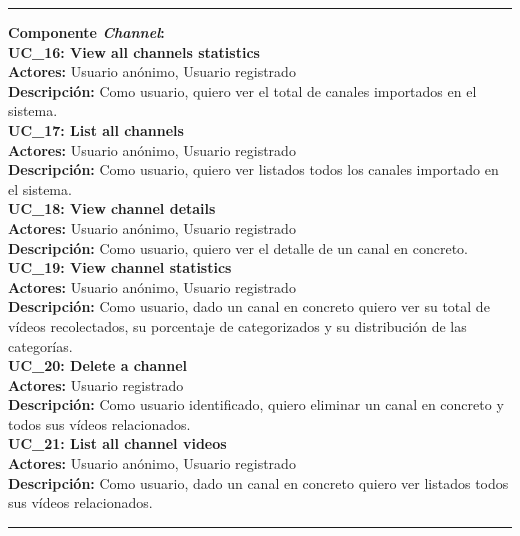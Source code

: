 \documentclass[11pt,a4paper]{article}
\begin{document}
\begin{center}\rule{10cm}{0.4pt}\end{center}

\noindent\textbf{Componente \textit{Channel}:}
\\

\noindent\textbf{UC\_16: View all channels statistics}\\
\textbf{Actores:} Usuario anónimo, Usuario registrado\\
\textbf{Descripción:} Como usuario, quiero ver el total de canales importados en el sistema.
\\

\noindent\textbf{UC\_17: List all channels}\\
\textbf{Actores:} Usuario anónimo, Usuario registrado\\
\textbf{Descripción:} Como usuario, quiero ver listados todos los canales importado en el sistema.
\\

\noindent\textbf{UC\_18: View channel details}\\
\textbf{Actores:} Usuario anónimo, Usuario registrado\\
\textbf{Descripción:} Como usuario, quiero ver el detalle de un canal en concreto.
\\

\noindent\textbf{UC\_19: View channel statistics}\\
\textbf{Actores:} Usuario anónimo, Usuario registrado\\
\textbf{Descripción:} Como usuario, dado un canal en concreto quiero ver su total de vídeos recolectados, su porcentaje de categorizados y su distribución de las categorías.
\\

\noindent\textbf{UC\_20: Delete a channel}\\
\textbf{Actores:} Usuario registrado\\
\textbf{Descripción:} Como usuario identificado, quiero eliminar un canal en concreto y todos sus vídeos relacionados.
\\

\noindent\textbf{UC\_21: List all channel videos}\\
\textbf{Actores:} Usuario anónimo, Usuario registrado\\
\textbf{Descripción:} Como usuario, dado un canal en concreto quiero ver listados todos sus vídeos relacionados.
\\

\begin{center}\rule{10cm}{0.4pt}\end{center}
\end{document}
